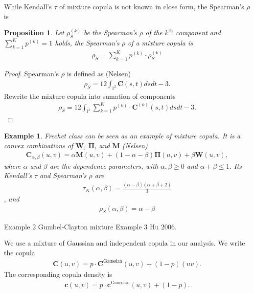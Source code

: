 \documentclass[square]{article} %
\newtheorem{prop}{Proposition}
\newtheorem{eg}{Example}
\begin{document}
    While Kendall's $\tau$ of mixture copula is not known in close form,
    the Spearman's $\rho$ is

    \begin{prop}
        Let $\rho_S^{(k)}$ be the Spearman's $\rho$ of the $k^\text{th}$ component and $\sum_{k=1}^K p^{(k)}=1$ holds,
        the Spearman's $\rho$ of a mixture copula is
        \begin{align}
            \rho_S = \sum_{k=1}^K p^{(k)} \cdot \rho_S^{(k)}
            \end{align}
        \end{prop}

    \begin{proof}
        Spearman's $\rho$ is defined as (Nelsen)
        \begin{align}
            \rho_S = 12 \int_{\mathbb{I}^2} \bm{C}(s,t) ds dt - 3.
            \end{align}
        Rewrite the mixture copula into sumation of components
           \begin{align}
            \rho_S = 12 \int_{\mathbb{I}^2} \sum_{k=1}^K p^{(k)} \cdot \bm{C}^{(k)}(s,t) ds dt - 3.
            \end{align}
        \end{proof}
    \begin{eg}
        Frechet class can be seen as an example of mixture copula.
        It is a convex combinations of $\bm{W}$, $\bm{\Pi}$, and $\bm{M}$ (Nelsen)
        \begin{align}
            \bm{C}_{\alpha, \beta}(u,v)
            = \alpha \bm{M}(u,v) +
            (1-\alpha-\beta)\bm{\Pi}(u,v)
            +\beta \bm{W}(u,v),
            \end{align}
        where $\alpha$ and $\beta$ are the dependence parameters, with $\alpha, \beta \geq 0$ and
        $\alpha+\beta \leq 1$.
        Its Kendall's $\tau$ and Spearman's $\rho$ are
        \begin{align}
            \tau_K(\alpha, \beta) = \frac{(\alpha - \beta)(\alpha+\beta+2)}{3}
            \end{align}
        , and
        \begin{align}
            \rho_S(\alpha, \beta) = \alpha - \beta
            \end{align}
        \end{eg}
    Example 2 Gumbel-Clayton mixture
    Example 3 Hu 2006.

    We use a mixture of Gaussian and independent copula in our analysis.
    We write the copula
    \begin{align}
        \bm{C}(u,v) = p\cdot \bm{C}^\text{Gaussian}(u,v) + (1-p)(uv).
        \end{align}
    The corresponding copula density is
    \begin{align}
        \bm{c}(u,v) = p\cdot \bm{c}^\text{Gaussian}(u,v) + (1-p).
        \end{align}
\end{document}
